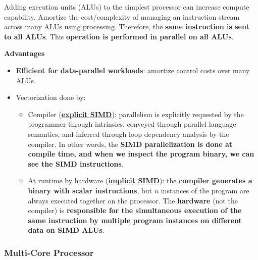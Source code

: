 Adding execution units (ALUs) to the simplest processor can increase compute capability. Amortize the cost/complexity of managing an instruction stream across many ALUs using  processing. Therefore, the \textbf{same instruction is sent to all ALUs}. This \textbf{operation is performed in parallel on all ALUs}.

\begin{flushleft}
    \textcolor{Green3}{ \textbf{Advantages}}
\end{flushleft}
\begin{itemize}
    \item \textbf{Efficient for data-parallel workloads}: amortize control costs over many ALUs.
    \item Vectorization done by:
    \begin{itemize}
        \item Compiler (\textbf{\underline{explicit SIMD}}): parallelism is explicitly requested by the programmer through intrinsics, conveyed through parallel language semantics, and inferred through loop dependency analysis by the  compiler. In other words, the \textbf{SIMD parallelization is done at compile time, and when we inspect the program binary, we can see the SIMD instructions}.

        \item At runtime by hardware (\textbf{\underline{implicit SIMD}}): the \textbf{compiler generates a binary with scalar instructions}, but $n$ instances of the program are always executed together on the processor. The \textbf{hardware} (not the compiler) is \textbf{responsible for the simultaneous execution of the same instruction by multiple program instances on different data on SIMD ALUs}.
    \end{itemize}
\end{itemize}

\longline

\subsubsection{Multi-Core Processor}

